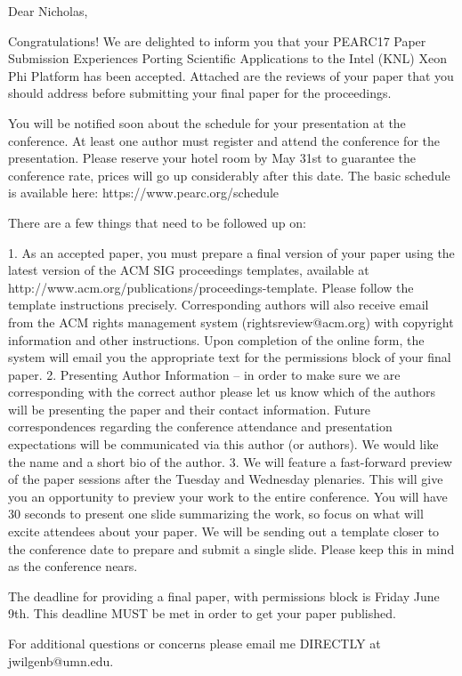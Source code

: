 Dear Nicholas,

Congratulations! We are delighted to inform you that your PEARC17 Paper
Submission  Experiences Porting Scientific Applications to the Intel
(KNL) Xeon Phi Platform has been accepted. Attached are the reviews of
your paper that you should address before submitting your final paper
for the proceedings.

You will be notified soon about the schedule for your presentation at
the conference. At least one author must register and attend the
conference for the presentation. Please reserve your hotel room by May
31st to guarantee the conference rate, prices will go up considerably
after this date. The basic schedule is available here:
https://www.pearc.org/schedule

There are a few things that need to be followed up on:

1.       As an accepted paper, you must prepare a final version of your
paper using the latest version of the ACM SIG proceedings templates,
available at
http://www.acm.org/publications/proceedings-template. Please follow the
template instructions precisely. Corresponding authors will also receive
email from the ACM rights management system (rightsreview@acm.org) with
copyright information and other instructions. Upon completion of the
online form, the system will email you the appropriate text for the
permissions block of your final paper.
2.       Presenting Author Information – in order to make sure we are
corresponding with the correct author please let us know which of the
authors will be presenting the paper and their contact
information. Future correspondences regarding the conference attendance
and presentation expectations will be communicated via this author (or
authors). We would like the name and a short bio of the author.
3.       We will feature a fast-forward preview of the paper sessions
after the Tuesday and Wednesday plenaries. This will give you an
opportunity to preview your work to the entire conference. You will have
30 seconds to present one slide summarizing the work, so focus on what
will excite attendees about your paper. We will be sending out a
template closer to the conference date to prepare and submit a single
slide. Please keep this in mind as the conference nears.

The deadline for providing a final paper, with permissions block is
Friday June 9th. This deadline MUST be met in order to get your paper
published.

For additional questions or concerns please email me DIRECTLY at
jwilgenb@umn.edu.

